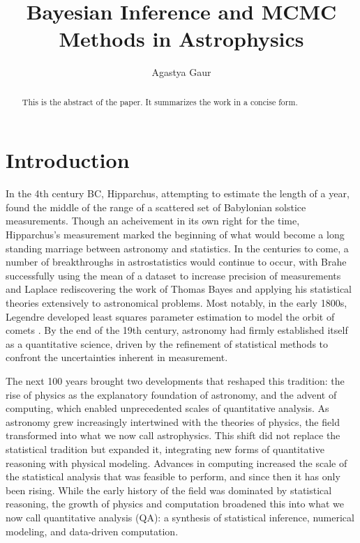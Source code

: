 \documentclass[twocolumn,linenumbers]{aastex631}
\begin{document}
\label{placeholder} %

\title{Bayesian Inference and MCMC Methods in Astrophysics}
\author{Agastya Gaur}

\begin{abstract}
  This is the abstract of the paper. It summarizes the work in a concise form.
\end{abstract}

\tableofcontents

\section{Introduction}
\label{sec:Introduction}
In the 4th century BC, Hipparchus, attempting to estimate the length of a year, found the middle of the range of a scattered set of Babylonian solstice measurements. Though an acheivement in its own right for the time, Hipparchus's measurement marked the beginning of what would become a long standing marriage between astronomy and statistics. In the centuries to come, a number of breakthroughs in astrostatistics would continue to occur, with Brahe successfully using the mean of a dataset to increase precision of measurements and Laplace rediscovering the work of Thomas Bayes and applying his statistical theories extensively to astronomical problems. Most notably, in the early 1800s, Legendre developed least squares parameter estimation to model the orbit of comets \citep{feigelsonStatisticalChallengesModern2004}. By the end of the 19th century, astronomy had firmly established itself as a quantitative science, driven by the refinement of statistical methods to confront the uncertainties inherent in measurement.

The next 100 years brought two developments that reshaped this tradition: the rise of physics as the explanatory foundation of astronomy, and the advent of computing, which enabled unprecedented scales of quantitative analysis. As astronomy grew increasingly intertwined with the theories of physics, the field transformed into what we now call astrophysics. This shift did not replace the statistical tradition but expanded it, integrating new forms of quantitative reasoning with physical modeling. Advances in computing increased the scale of the statistical analysis that was feasible to perform, and since then it has only been rising. While the early history of the field was dominated by statistical reasoning, the growth of physics and computation broadened this into what we now call quantitative analysis (QA): a synthesis of statistical inference, numerical modeling, and data-driven computation.
\end{document}
